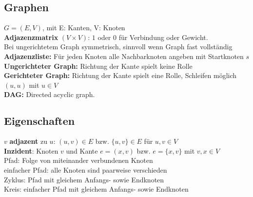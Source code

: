\documentclass[fs, footer]{latex4ei}
\begin{document}
\begin{multicols*}{4}
{{




\section{Graphen}
$G = (E, V)$, mit E: Kanten, V: Knoten\\
\textbf{Adjazenzmatrix} $(V \times V)$: $1$ oder $0$ für Verbindung oder Gewicht.\\
Bei ungerichtetem Graph symmetrisch, sinnvoll wenn Graph fast vollständig\\
\textbf{Adjazenzliste:} Für jeden Knoten alle Nachbarknoten angeben mit Startknoten $s$\\

\textbf{Ungerichteter Graph:} Richtung der Kante spielt keine Rolle\\
\textbf{Gerichteter Graph:} Richtung der Kante spielt eine Rolle, Schleifen möglich $(u, u)$ mit $u \in V$\\
\textbf{DAG:} Directed acyclic graph.

\subsection{Eigenschaften}
$v$ \textbf{adjazent} zu $u$: $(u,v) \in E$ bzw. $\{u, v\} \in E$ für $u, v \in V$\\
\textbf{Inzident}: Knoten $v$ und Kante $e = (x, v)$ bzw. $e = \{x, v\}$ mit $v, x \in V$\\

Pfad: Folge von miteinander verbundenen Knoten\\
einfacher Pfad: alle Knoten sind paarweise verschieden\\
Zyklus: Pfad mit gleichem Anfangs- sowie Endknoten\\
Kreis: einfacher Pfad mit gleichem Anfangs- sowie Endknoten

}}
\end{multicols*}
\end{document}
